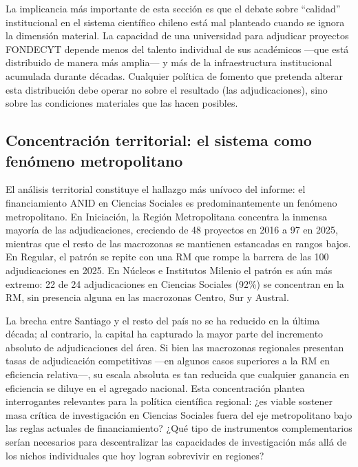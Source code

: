 \documentclass[
  spanish,
  a4paper,
  oneside]{scrbook}
\begin{document}
La implicancia más importante de esta sección es que el debate sobre
``calidad'' institucional en el sistema científico chileno está mal
planteado cuando se ignora la dimensión material. La capacidad de una
universidad para adjudicar proyectos FONDECYT depende menos del talento
individual de sus académicos ---que está distribuido de manera más
amplia--- y más de la infraestructura institucional acumulada durante
décadas. Cualquier política de fomento que pretenda alterar esta
distribución debe operar no sobre el resultado (las adjudicaciones),
sino sobre las condiciones materiales que las hacen posibles.

\subsection{Concentración territorial: el sistema como fenómeno
metropolitano}\label{concentraciuxf3n-territorial-el-sistema-como-fenuxf3meno-metropolitano}

El análisis territorial constituye el hallazgo más unívoco del informe:
el financiamiento ANID en Ciencias Sociales es predominantemente un
fenómeno metropolitano. En Iniciación, la Región Metropolitana concentra
la inmensa mayoría de las adjudicaciones, creciendo de 48 proyectos en
2016 a 97 en 2025, mientras que el resto de las macrozonas se mantienen
estancadas en rangos bajos. En Regular, el patrón se repite con una RM
que rompe la barrera de las 100 adjudicaciones en 2025. En Núcleos e
Institutos Milenio el patrón es aún más extremo: 22 de 24 adjudicaciones
en Ciencias Sociales (92\%) se concentran en la RM, sin presencia alguna
en las macrozonas Centro, Sur y Austral.

La brecha entre Santiago y el resto del país no se ha reducido en la
última década; al contrario, la capital ha capturado la mayor parte del
incremento absoluto de adjudicaciones del área. Si bien las macrozonas
regionales presentan tasas de adjudicación competitivas ---en algunos
casos superiores a la RM en eficiencia relativa---, su escala absoluta
es tan reducida que cualquier ganancia en eficiencia se diluye en el
agregado nacional. Esta concentración plantea interrogantes relevantes
para la política científica regional: ¿es viable sostener masa crítica
de investigación en Ciencias Sociales fuera del eje metropolitano bajo
las reglas actuales de financiamiento? ¿Qué tipo de instrumentos
complementarios serían necesarios para descentralizar las capacidades de
investigación más allá de los nichos individuales que hoy logran
sobrevivir en regiones?
\end{document}
